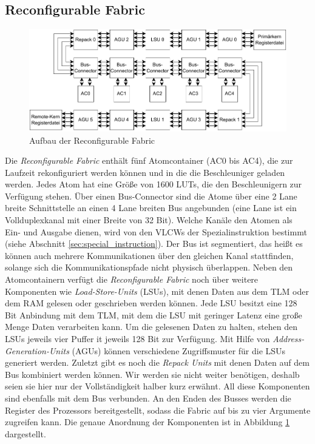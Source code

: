 \subsection{Reconfigurable Fabric}
\begin{figure}
    \center
    \includegraphics{images/Icore_Fabric.pdf}
    \caption{Aufbau der Reconfigurable Fabric}
    \label{fig:icore_fabric}
\end{figure}
Die \textit{Reconfigurable Fabric} enthält fünf Atomcontainer (AC0 bis AC4), die zur Laufzeit rekonfiguriert werden können und in die die Beschleuniger geladen werden.
Jedes Atom hat eine Größe von 1600 LUTs, die den Beschleunigern zur Verfügung stehen. Über einen Bus-Connector sind die Atome über eine 2 Lane breite Schnittstelle
an einen 4 Lane breiten Bus angebunden (eine Lane ist ein Vollduplexkanal mit einer Breite von 32 Bit). Welche Kanäle den Atomen als Ein- und Ausgabe dienen,
wird von den VLCWs der Spezialinstruktion bestimmt (siehe Abschnitt \ref{sec:special_instruction}). Der Bus ist segmentiert, das heißt es können auch mehrere Kommunikationen über den gleichen Kanal stattfinden,
solange sich die Kommunikationspfade nicht physisch überlappen. Neben den Atomcontainern verfügt die \textit{Reconfigurable Fabric}
noch über weitere Komponenten wie \textit{Load-Store-Units} (LSUs), mit denen Daten aus dem TLM oder dem RAM gelesen oder geschrieben werden können. Jede LSU besitzt eine 128 Bit Anbindung mit dem TLM,
mit dem die LSU mit geringer Latenz eine große Menge Daten verarbeiten kann. Um die gelesenen Daten zu halten, stehen den LSUs jeweils vier Puffer it jeweils 128 Bit zur Verfügung.
Mit Hilfe von \textit{Address-Generation-Units} (AGUs) können verschiedene Zugriffsmuster für die LSUs generiert werden.
Zuletzt gibt es noch die \textit{Repack Units} mit denen Daten auf dem Bus kombiniert werden können. Wir werden sie nicht weiter benötigen, deshalb seien sie hier nur der Vollständigkeit halber kurz erwähnt.
All diese Komponenten sind ebenfalls mit dem Bus verbunden. An den Enden des Busses werden die Register des Prozessors bereitgestellt, sodass die Fabric auf bis zu vier Argumente zugreifen kann.
Die genaue Anordnung der Komponenten ist in Abbildung \ref{fig:icore_fabric} dargestellt.

